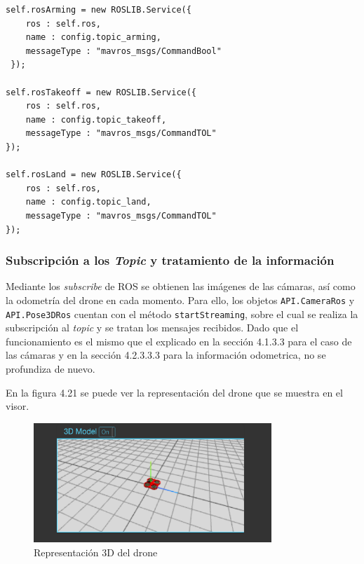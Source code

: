 \begin{lstlisting}[caption= {Definición de los mensajes para arrancar, despegar y aterrizar}, label=cod.mensajeextradrone]
self.rosArming = new ROSLIB.Service({
	ros : self.ros,
	name : config.topic_arming,
	messageType : "mavros_msgs/CommandBool"
 });

self.rosTakeoff = new ROSLIB.Service({
	ros : self.ros,
	name : config.topic_takeoff,
	messageType : "mavros_msgs/CommandTOL"
});

self.rosLand = new ROSLIB.Service({
	ros : self.ros,
	name : config.topic_land,
	messageType : "mavros_msgs/CommandTOL"
});
\end{lstlisting}

\subsubsection{Subscripción a los \textit{Topic} y tratamiento de la información}

Mediante los \textit{subscribe} de ROS se obtienen las imágenes de las cámaras, así como la odometría del drone en cada momento. Para ello, los objetos \texttt{API.CameraRos} y \texttt{API.Pose3DRos} cuentan con el método \texttt{startStreaming}, sobre el cual se realiza la subscripción al \textit{topic} y se tratan los mensajes recibidos. Dado que el funcionamiento es el mismo que el explicado en la sección 4.1.3.3 para el caso de las cámaras y en la sección 4.2.3.3.3 para la información odometrica, no se profundiza de nuevo.

En la figura 4.21 se puede ver la representación del drone que se muestra en el visor.

\begin{figure}[H]
  \begin{center}
    \includegraphics[width=0.8\textwidth]{figures/3ddrone.png}
		\caption{Representación 3D del drone}
		\label{fig.3ddrone}
		\end{center}
\end{figure}

